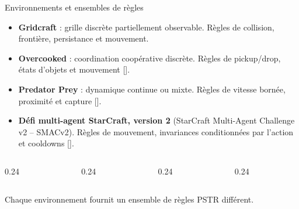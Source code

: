 \documentclass[aspectratio=169]{beamer}
\newcommand{\scite}[1]{{\normalfont\color{SpaceCyan!60!black}[\citealp{#1}]}}
\begin{document}
\begin{frame}{Environnements et ensembles de règles}
  \scriptsize
  \begin{itemize}
    \item \textbf{Gridcraft} : grille discrète partiellement observable.
          Règles de collision, frontière, persistance et mouvement.
    \item \textbf{Overcooked} : coordination coopérative discrète.
          Règles de pickup/drop, états d'objets et mouvement \scite{Micah2020overcooked}.
    \item \textbf{Predator Prey} : dynamique continue ou mixte.
          Règles de vitesse bornée, proximité et capture \scite{lowe2017multi}.
    \item \textbf{Défi multi-agent StarCraft, version 2}
          (StarCraft Multi-Agent Challenge v2 -- SMACv2).
          Règles de mouvement, invariances conditionnées par l'action et cooldowns \scite{Ellis2023smacv2}.
  \end{itemize}

  \begin{columns}[totalwidth=\textwidth]
    \begin{column}{0.24\linewidth}
    \end{column}%
    \begin{column}{0.24\linewidth}
    \end{column}%
    \begin{column}{0.24\linewidth}
      \hspace{-0.8cm}
    \end{column}%
    \begin{column}{0.24\linewidth}
      \hspace{-1.2cm}
    \end{column}
  \end{columns}



  \vspace{0.18cm}
  Chaque environnement fournit un ensemble de règles PSTR différent.
\end{frame}
\end{document}
